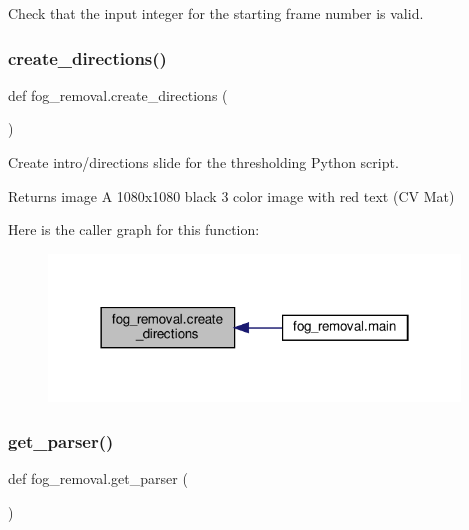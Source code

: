 Check that the input integer for the starting frame number is valid. 

\mbox{\label{namespacefog__removal_acc10907c635ab765dcf02a6fc6499620}} 
\subsubsection{\texorpdfstring{create\+\_\+directions()}{create\_directions()}}
{\footnotesize\ttfamily def fog\+\_\+removal.\+create\+\_\+directions (\begin{DoxyParamCaption}{ }\end{DoxyParamCaption})}



Create intro/directions slide for the thresholding Python script. 

\begin{DoxyReturn}{Returns}
image A 1080x1080 black 3 color image with red text (CV Mat) 
\end{DoxyReturn}
Here is the caller graph for this function\+:\nopagebreak
\begin{figure}[H]
\begin{center}
\leavevmode
\includegraphics[width=310pt]{namespacefog__removal_acc10907c635ab765dcf02a6fc6499620_icgraph}
\end{center}
\end{figure}
\mbox{\label{namespacefog__removal_a89c98f8f9a6d048485938fc05675ce9e}} 
\subsubsection{\texorpdfstring{get\+\_\+parser()}{get\_parser()}}
{\footnotesize\ttfamily def fog\+\_\+removal.\+get\+\_\+parser (\begin{DoxyParamCaption}{ }\end{DoxyParamCaption})}



